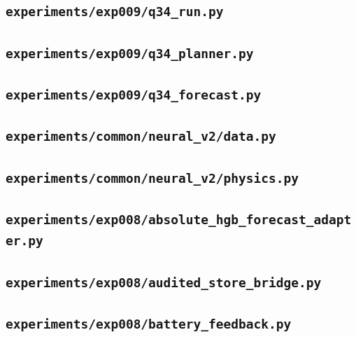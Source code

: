 \subsection*{\nolinkurl{experiments/exp009/q34_run.py}}


\subsection*{\nolinkurl{experiments/exp009/q34_planner.py}}


\subsection*{\nolinkurl{experiments/exp009/q34_forecast.py}}


\subsection*{\nolinkurl{experiments/common/neural_v2/data.py}}


\subsection*{\nolinkurl{experiments/common/neural_v2/physics.py}}


\subsection*{\nolinkurl{experiments/exp008/absolute_hgb_forecast_adapter.py}}


\subsection*{\nolinkurl{experiments/exp008/audited_store_bridge.py}}


\subsection*{\nolinkurl{experiments/exp008/battery_feedback.py}}


